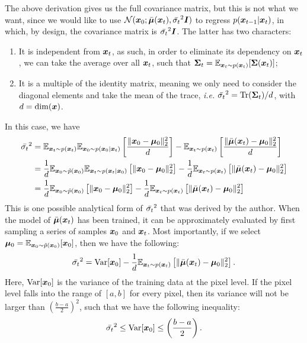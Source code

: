 The above derivation gives us the full covariance matrix, but this is not what we want, since we would like to use $\mathcal{N}(\bm{x}_0;\bar{\bm{\mu}}(\bm{x}_{t}),\bar{\sigma_t}^2\bm{I})$ to regress $p(\bm{x}_{t-1}|\bm{x}_{t})$, in which, by design, the covariance matrix is $\bar{\sigma_t}^2\bm{I}$. The latter has two characters:
\begin{myquote}
    \begin{enumerate}
        \item It is independent from $\bm{x}_{t}$, as such, in order to eliminate its dependency on $\bm{x}_{t}$, we can take the average over all $\bm{x}_{t}$, such that $\bm{\Sigma}_t=\mathbb{E}_{\bm{x}_{t}\sim p(\bm{x}_{t})}[\bm{\Sigma}(\bm{x}_{t})]$;
        \item It is a multiple of the identity matrix, meaning we only need to consider the diagonal elements and take the mean of the trace, \emph{i.e.} $\bar{\sigma_t}^2=\mbox{Tr}(\bm{\Sigma}_t)/d$, with $d=\dim (\bm{x})$.
    \end{enumerate}
\end{myquote}
In this case, we have 
\begin{align}
    \bar{\sigma_t}^2&=\mathbb{E}_{\bm{x}_{t}\sim p(\bm{x}_{t})}\mathbb{E}_{\bm{x}_0\sim p(\bm{x}_0|\bm{x}_{t})}\left[\frac{\|\bm{x}_0-\bm{\mu}_0 \|_2^2}{d}\right] - \mathbb{E}_{\bm{x}_{t}\sim p(\bm{x}_{t})} \left[\frac{\| \bar{\bm{\mu}}(\bm{x}_{t})-\bm{\mu}_0 \|_2^2}{d} \right] \nonumber \\
    &=\frac{1}{d}\mathbb{E}_{\bm{x}_0\sim \tilde{p}(\bm{x}_0)}\mathbb{E}_{\bm{x}_{t}\sim p(\bm{x}_{t}|\bm{x}_0)}\left[\|\bm{x}_0-\bm{\mu}_0 \|_2^2 \right] - \frac{1}{d} \mathbb{E}_{\bm{x}_{t}\sim p(\bm{x}_{t})} \left[ \| \bar{\bm{\mu}}(\bm{x}_{t})-\bm{\mu}_0 \|_2^2 \right] \nonumber \\
&=\frac{1}{d}\mathbb{E}_{\bm{x}_0\sim \tilde{p}(\bm{x}_0)}  \left[\|\bm{x}_0-\bm{\mu}_0 \|_2^2 \right]- \frac{1}{d} \mathbb{E}_{\bm{x}_{t}\sim p(\bm{x}_{t})} \left[ \| \bar{\bm{\mu}}(\bm{x}_{t})-\bm{\mu}_0 \|_2^2 \right]\label{eq:7.9}
\end{align}
This is one possible analytical form of $\bar{\sigma_t}^2$ that was derived by the author. When the model of $\bar{\bm{\mu}}(\bm{x}_{t})$ has been trained, it can be approximately evaluated by first sampling a series of samples $\bm{x}_0$ and $\bm{x}_{t}$. Most importantly, if we select $\bm{\mu}_0=\mathbb{E}_{\bm{x}_0\sim\tilde{p}(\bm{x}_0)}[\bm{x}_0]$, then we have the following:
\begin{equation}
    \label{eq:7.10}
     \bar{\sigma_t}^2=\mbox{Var}[\bm{x}_0]-\frac{1}{d} \mathbb{E}_{\bm{x}_{t}\sim p(\bm{x}_{t})} \left[ \| \bar{\bm{\mu}}(\bm{x}_{t})-\bm{\mu}_0 \|_2^2 \right].
\end{equation}
Here, $\mbox{Var}[\bm{x}_0]$ is the variance of the training data at the pixel level. If the pixel level falls into the range of $[a,b]$ for every pixel, then its variance will not be larger than $\left(\frac{b-a}{2}\right)^2$, such that we have the following inequality:
\begin{equation}
    \label{eq:7.11}
    \bar{\sigma_t}^2\leq \mbox{Var}[\bm{x}_0] \leq \left(\frac{b-a}{2}\right).
\end{equation}

